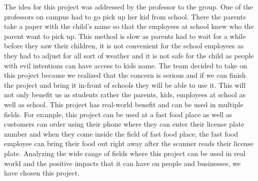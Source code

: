 \quad \quad The idea for this project was addressed by the professor to the group. 
One of the professors on campus had to go pick up her kid from school. There the 
parents take a paper with the child's name so that the employees at school knew who 
the parent want to pick up. This method is slow as parents had to wait for a while 
before they saw their children, it is not convenient for the school employees as they 
had to adjust for all sort of weather and it is not safe for the child as people with 
evil intentions can have access to kids name.
The team decided to take on this project because we realized that the concern is 
serious and if we can finish the project and bring it in-front of schools they will be 
able to use it. This will not only benefit us as students rather the parents, kids, 
employees at school as well as school. This project has real-world benefit and can be 
used in multiple fields. For example, this project can be used at a fast food place as 
well as customers can order using their phone where they can enter their license plate 
number and when they come inside the field of fast food place, the fast food employee 
can bring their food out right away after the scanner reads their license plate. 
Analyzing the wide range of fields where this project can be used in real world and 
the positive impacts that it can have on people and businesses, we have chosen this 
project.